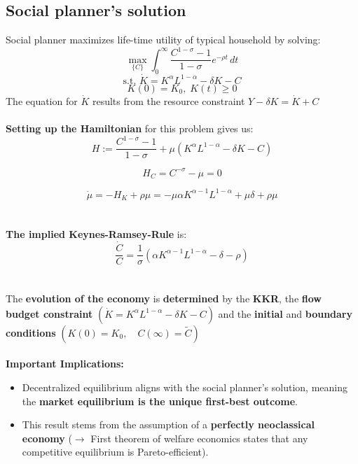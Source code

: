 \subsection{Social planner's solution}
Social planner maximizes life-time utility of typical household by solving: 
$$\max_{\{C\}} \int_{0}^{\infty} \frac{C^{1-\sigma} - 1}{1-\sigma} e^{-\rho t}\, dt$$
$$\text{s.t. } \dot{K} = K^{\alpha} L^{1-\alpha} - \delta K - C$$
$$K(0) = K_0,\; K(t) \ge 0$$
The equation for $\dot{K}$ results from the resource constraint $Y-\delta K=\dot{K}+C$ \\\\
\textbf{Setting up the Hamiltonian} for this problem gives us: 
\[ H := \frac{C^{1-\sigma} - 1}{1 - \sigma} + \mu (K^{\alpha} L^{1-\alpha} - \delta K - C) \]

\[ H_{C} = C^{-\sigma} - \mu = 0 \]

\[ \dot{\mu} = -H_{K} + \rho \mu = -\mu \alpha K^{\alpha-1} L^{1-\alpha} + \mu \delta + \rho \mu \]\\\\
\textbf{The implied Keynes-Ramsey-Rule} is: 
\[ \frac{\dot{C}}{C} = \frac{1}{\sigma} \left( \alpha K^{\alpha-1} L^{1-\alpha} - \delta - \rho \right)\]\\\\
The \textbf{evolution of the economy} is \textbf{determined} by the \textbf{KKR}, the \textbf{flow budget constraint} $(\dot{K} = K^{\alpha} L^{1-\alpha} - \delta K - C)$ and the \textbf{initial} and \textbf{boundary} \textbf{conditions} $(K(0)=K_0, \quad C(\infty)=\tilde{C})$\\\\
\textbf{Important Implications:}
\begin{itemize}
    \item Decentralized equilibrium aligns with the social planner’s solution, meaning the \textbf{market equilibrium is the unique first-best outcome}.

\item This result stems from the assumption of a \textbf{perfectly neoclassical economy} ($\rightarrow$ First theorem of welfare economics states that any competitive equilibrium is Pareto-efficient).
\end{itemize}




